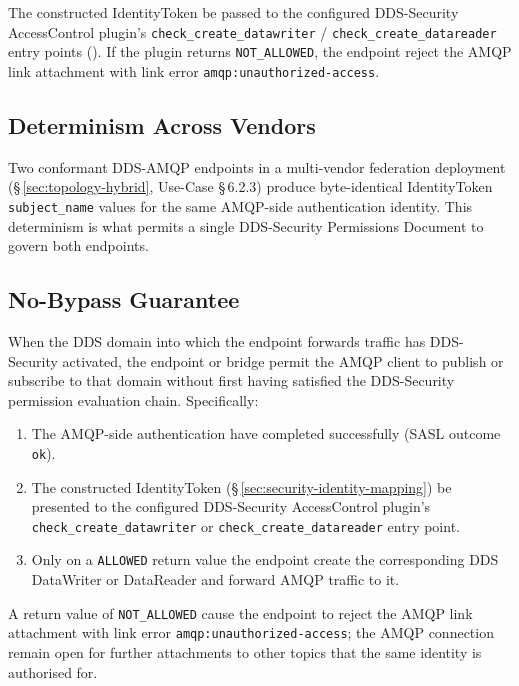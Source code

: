 \documentclass{../styles/zerodds-vendor-spec}
\begin{document}
The constructed IdentityToken  be passed to the
configured DDS-Security AccessControl plugin's
\texttt{check\_create\_datawriter} /
\texttt{check\_create\_datareader} entry points
(). If the plugin returns
\texttt{NOT\_ALLOWED}, the endpoint  reject the
AMQP link attachment with link error
\texttt{amqp:unauthorized-access}.

\subsection{Determinism Across Vendors}

Two conformant DDS-AMQP endpoints in a multi-vendor federation
deployment (\S\,\ref{sec:topology-hybrid}, Use-Case
\S\,6.2.3)  produce byte-identical IdentityToken
\texttt{subject\_name} values for the same AMQP-side
authentication identity. This determinism is what permits a
single DDS-Security Permissions Document to govern both
endpoints.

\subsection{No-Bypass Guarantee}\label{sec:security-no-bypass}

When the DDS domain into which the endpoint forwards traffic has
DDS-Security activated, the endpoint or bridge 
permit the AMQP client to publish or subscribe to that domain
without first having satisfied the DDS-Security permission
evaluation chain. Specifically:

\begin{enumerate}
  \item The AMQP-side authentication  have completed
        successfully (SASL outcome \texttt{ok}).
  \item The constructed IdentityToken
        (\S\,\ref{sec:security-identity-mapping}) 
        be presented to the configured DDS-Security
        AccessControl plugin's
        \texttt{check\_create\_datawriter} or
        \texttt{check\_create\_datareader} entry point.
  \item Only on a \texttt{ALLOWED} return value  the
        endpoint create the corresponding DDS DataWriter or
        DataReader and forward AMQP traffic to it.
\end{enumerate}

A return value of \texttt{NOT\_ALLOWED}  cause the
endpoint to reject the AMQP link attachment with link error
\texttt{amqp:unauthorized-access}; the AMQP connection
 remain open for further attachments to other topics
that the same identity is authorised for.
\end{document}
